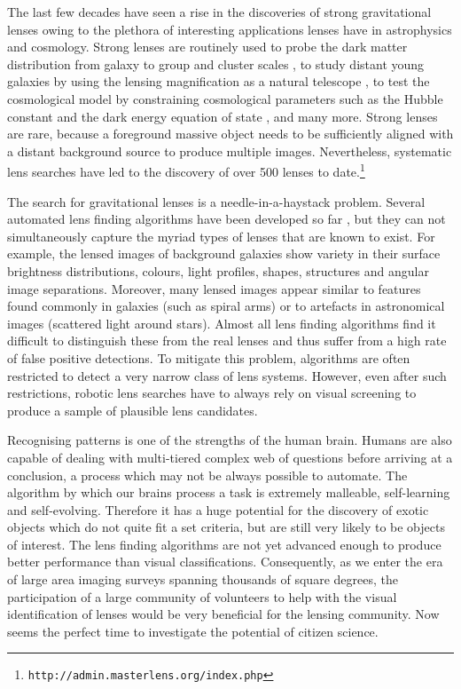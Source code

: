 \documentclass[useAMS,usenatbib,a4paper]{mn2e}
\begin{document}
The last few decades have seen a rise in the discoveries of strong
gravitational lenses owing to the plethora of interesting applications
lenses have in astrophysics and cosmology. Strong lenses are routinely
used to probe the dark matter distribution from galaxy
\citep[e.g.][]{Koopmans2006,Barnabe2009,Leier2011,Sonnenfeld2015} to group and
cluster scales
\citep[e.g.][]{Limousin2008,Zitrin2011,Oguri2012,More2012,Newman2013}, to
study distant young galaxies by using the lensing magnification as a
natural telescope \citep[e.g.][]{Zitrin2009,Zheng2012,Whitaker2014}, to
test the cosmological model by constraining cosmological parameters such
as the Hubble constant and the dark energy equation of state
\citep[e.g.][]{Suyu2010,Collett2012,Collett2014,Sereno2014}, and many more. Strong
lenses are rare, because a foreground massive object needs to be
sufficiently aligned with a distant background source to produce
multiple images. Nevertheless, systematic lens searches have led to the
discovery of over 500 lenses to
date.\footnote{\texttt{http://admin.masterlens.org/index.php}}

The search for gravitational lenses is a needle-in-a-haystack problem.
Several automated lens finding algorithms have
been developed so far
\citep[e.g.][]{Lenzen2004,Alard2006,Seidel2007,More2012,Brault2014,Gavazzi2014},
but they can not
simultaneously capture the myriad types of lenses that are known to
exist. For example, the lensed images of background galaxies show
variety in their surface brightness distributions, colours, light
profiles, shapes, structures and angular image separations.  Moreover,
many lensed images appear similar to features found commonly in galaxies
(such as spiral arms) or to artefacts in astronomical images (scattered
light around stars).  Almost all lens finding algorithms find it
difficult to distinguish these from the real lenses and thus suffer
from a high rate of false positive detections.  To mitigate this problem,
algorithms are often restricted to detect a very narrow class of lens
systems. However, even after such restrictions, robotic lens searches
have to always rely on visual screening to produce a sample of plausible
lens candidates.

Recognising patterns is one of the
strengths of the human brain. Humans are also capable of dealing with
multi-tiered complex web of questions before arriving at a conclusion, a process
which may
not be always possible to automate. The algorithm by which our brains process a
task is extremely malleable, self-learning and self-evolving. Therefore it has
a huge potential for the discovery of exotic objects which do not quite fit a
set criteria, but are still very likely to be objects of interest. The lens
finding algorithms are not yet advanced enough to produce better performance
than visual classifications. Consequently, as we enter the era of
large area imaging surveys spanning thousands of square degrees,
the participation of a large community of
volunteers to help with the visual identification of lenses would be very
beneficial for the lensing community.  Now seems
the perfect time to investigate the potential of citizen science.
\end{document}
